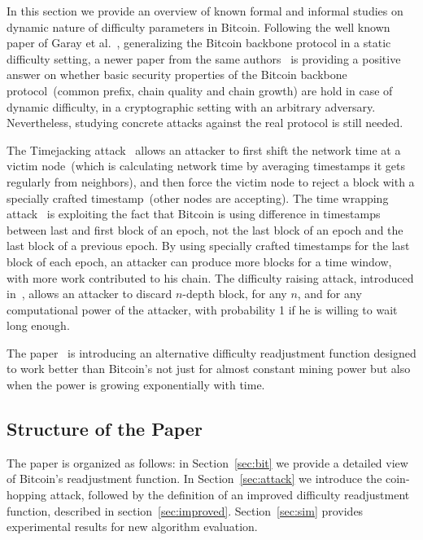 \documentclass[]{llncs}
\begin{document}
In this section we provide an overview of known formal and informal studies on dynamic nature of difficulty parameters in Bitcoin. Following the well known paper of Garay et al.~\cite{garay2015bitcoin}, generalizing the Bitcoin backbone protocol in a static difficulty setting, a newer paper from the same authors~\cite{gkl16} is providing a positive answer on whether basic security properties of the Bitcoin backbone protocol~(common prefix, chain quality and chain growth) are hold in case of dynamic difficulty, in a cryptographic setting with an arbitrary adversary. Nevertheless, studying concrete attacks against the real protocol is still needed.      

The Timejacking attack~\cite{timejacking2011} allows an attacker to first shift the network time at a victim node~(which is calculating network time by averaging timestamps it gets regularly from neighbors), and then force the victim node to reject a block with a specially crafted timestamp~(other nodes are accepting). The time wrapping attack~\cite{artforz2011} is exploiting the fact that Bitcoin is using difference in timestamps between last and first block of an epoch, not the last block of an epoch and the last block of a previous epoch. By using specially crafted timestamps for the last block of each epoch, an attacker can produce more blocks for a time window, with more work contributed to his chain. The difficulty raising attack, introduced in~\cite{bahack2013theoretical}, allows an attacker to discard $n$-depth block, for any $n$, and for any computational power of the attacker, with probability 1 if he is willing to wait long enough.

The paper~\cite{kraft2015difficulty} is introducing an alternative difficulty readjustment function designed to work better than Bitcoin's not just for almost constant mining power but also when the power is growing exponentially with time. %

\subsection{Structure of the Paper}

The paper is organized as follows: in Section~\ref{sec:bit} we provide a detailed view of Bitcoin's readjustment function. In Section~\ref{sec:attack} we introduce the coin-hopping attack, followed by the definition of an improved difficulty readjustment function, described in section~\ref{sec:improved}. Section~\ref{sec:sim} provides experimental results for new algorithm evaluation. 
\end{document}
